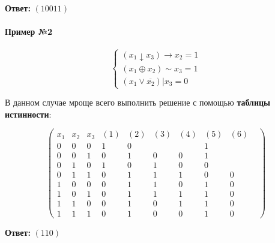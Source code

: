 \documentclass{article}
\begin{document}
\textbf{Ответ:} $(10011)$

\paragraph{Пример №2}

\begin{equation}
    \begin{cases}
        (x_1 \downarrow x_3) \rightarrow x_2 = 1 \\
        (x_1 \oplus x_2) \sim x_3 = 1 \\
        (x_1 \lor \overline{x_2}) | x_3 = 0
    \end{cases}
\end{equation}

В данном случае мроще всего выполнить решение с помощью \textbf{таблицы истинности}:

$$\begin{pmatrix}
    x_1 & x_2 & x_3 & (1) & (2) & (3) & (4) & (5) & (6) \\
    0 & 0 & 0 & 1 & 0 & & & 1 &  & \\
    0 & 0 & 1 & 0 & 1 & 0 & 0 & 1 & \\
    0 & 1 & 0 & 1 & 0 & 1 & 0 & 0 & \\
    0 & 1 & 1 & 0 & 1 & 1 & 1 & 0 & 0 \\
    1 & 0 & 0 & 0 & 1 & 1 & 0 & 1 & 0\\
    1 & 0 & 1 & 0 & 1 & 1 & 1 & 1 & 0 \\
    1 & 1 & 0 & 0 & 1 & 0 & 1 & 1 & 0 \\
    1 & 1 & 1 & 0 & 1 & 0 & 0 & 1 & 0
\end{pmatrix}
$$

\textbf{Ответ:} $(110)$
\end{document}
